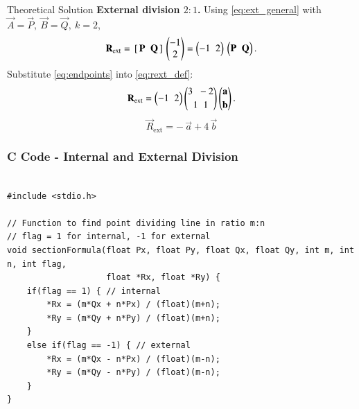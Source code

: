 \documentclass{beamer}
\begin{document}
\begin{frame}{Theoretical Solution}
    \noindent \textbf{External division \(2:1\).}
Using \eqref{eq:ext_general} with \(\vec A=\vec P,\ \vec B=\vec Q,\ k=2\),
\begin{equation}
\mathbf R_{\text{ext}}
=\,[\,\mathbf P\;\;\mathbf Q\,]\,
\begin{pmatrix}-1\\ 2\end{pmatrix}
=\begin{pmatrix}-1 \;\; 2\end{pmatrix}\,\begin{pmatrix}\mathbf P \;\; \mathbf Q\end{pmatrix}.
\label{eq:rext_def}
\end{equation}
Substitute \eqref{eq:endpoints} into \eqref{eq:rext_def}:
\begin{equation}
\mathbf R_{\text{ext}}
=
\begin{pmatrix}-1 \;\; 2\end{pmatrix}
\begin{pmatrix}3 \;\; -2 \\[2pt] 1 \;\; 1\end{pmatrix}
\begin{pmatrix}\mathbf a \\[2pt] \mathbf b\end{pmatrix}.
\label{eq:rext_sub}
\end{equation}
\begin{equation}
\boxed{\;\vec R_{\text{ext}}=-\,\vec a+4\,\vec b\;}
\label{eq:rext_final}
\end{equation}
\end{frame}

\begin{frame}[fragile]
    \frametitle{C Code - Internal and External Division}
    \begin{lstlisting}

#include <stdio.h>

// Function to find point dividing line in ratio m:n
// flag = 1 for internal, -1 for external
void sectionFormula(float Px, float Py, float Qx, float Qy, int m, int n, int flag,
                    float *Rx, float *Ry) {
    if(flag == 1) { // internal
        *Rx = (m*Qx + n*Px) / (float)(m+n);
        *Ry = (m*Qy + n*Py) / (float)(m+n);
    }
    else if(flag == -1) { // external
        *Rx = (m*Qx - n*Px) / (float)(m-n);
        *Ry = (m*Qy - n*Py) / (float)(m-n);
    }
}



    
     \end{lstlisting}
    \end{frame}
\end{document}
